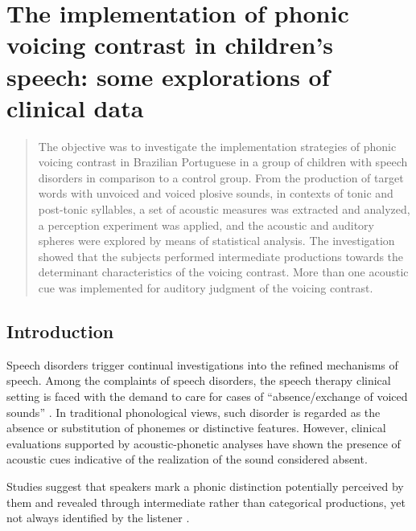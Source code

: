 \chapter{The implementation of phonic voicing contrast in children’s speech: some explorations of clinical data}\label{ch:zuleicacamarg13}
\begin{affils}
\end{affils}


\begin{abstract}
The objective was to investigate the implementation strategies of phonic
voicing contrast in Brazilian Portuguese in a group of children with speech
disorders in comparison to a control group. From the production of target words
with unvoiced and voiced plosive sounds, in contexts of tonic and post-tonic
syllables, a set of acoustic measures was extracted and analyzed, a perception
experiment was applied, and the acoustic and auditory spheres were explored by
means of statistical analysis. The investigation showed that the subjects
performed intermediate productions towards the determinant characteristics of
the voicing contrast. More than one acoustic cue was implemented for auditory
judgment of the voicing contrast.
\end{abstract}


\section{Introduction}
Speech disorders trigger continual investigations into the refined mechanisms
of speech. Among the complaints of speech disorders, the speech therapy
clinical setting is faced with the demand to care for cases of
“absence/exchange of voiced sounds” \citep{keskesoares2004,mota2012}.
In traditional phonological views, such disorder is regarded as the
absence or substitution of phonemes or distinctive features. However, clinical
evaluations supported by acoustic-phonetic analyses have shown the presence of
acoustic cues indicative of the realization of the sound considered absent.

Studies suggest that speakers mark a phonic distinction potentially perceived
by them and revealed through intermediate rather than categorical productions,
yet not always identified by the listener \citep{levy1993,ficker2003,gregio2005m,rodrigues2008,gregio2011,pereira2012}.


